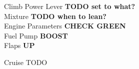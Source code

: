 \documentclass{article}
\newcommand{\checkitem}[2]{#1 \dotfill \textbf{#2} \\}
\begin{document}
\begin{multicols}{3}
    \begin{checklistbox}{Climb}
        \checkitem{Power Lever}{TODO set to what?}
        \checkitem{Mixture}{TODO when to lean?}
        \checkitem{Engine Parameters}{CHECK GREEN}
        \checkitem{Fuel Pump}{BOOST}
        \checkitem{Flaps}{UP}
    \end{checklistbox}

    \begin{checklistbox}{Cruise}
        \checkitem{TODO}{}
    \end{checklistbox}

\end{multicols}
\end{document}
